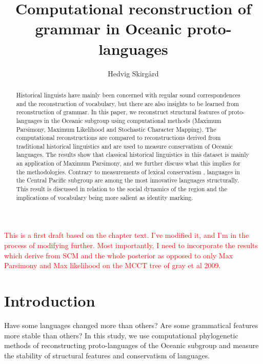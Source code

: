 \documentclass[draft,10pt]{article} %
\title{Computational reconstruction of grammar in Oceanic proto-languages}
\author{Hedvig Skirg{\aa}rd}
\begin{document}
\def\code#1{\texttt{#1}}

\thispagestyle{empty}

\maketitle
\thispagestyle{empty}

\tableofcontents
\newpage


\textcolor{red}{This is a first draft based on the chapter text. I've modified it, and I'm in the process of modifying further. Most importantly, I need to incorporate the results which derive from SCM and the whole posterior as opposed to only Max Parsimony and Max likelihood on the MCCT tree of gray et al 2009.}



\begin{abstract}


Historical linguists have mainly been concerned with regular sound correspondences and the reconstruction of vocabulary, but there are also insights to be learned from reconstruction of grammar. In this paper, we reconstruct structural features of proto-languages in the Oceanic subgroup using computational methods (Maximum Parsimony, Maximum Likelihood and Stochastic Character Mapping). The computational reconstructions are compared to reconstructions derived from traditional historical linguistics and are used to measure conservatism of Oceanic languages. The results show that classical historical linguistics in this dataset is mainly an application of Maximum Parsimony, and we further discuss what this implies for the methodologies. Contrary to measurements of lexical conservatism \citep{blust1981}, languages in the Central Pacific subgroup are among the most innovative languages structurally. This result is discussed in relation to the social dynamics of the region and the implications of vocabulary being more salient as identity marking.
\end{abstract}
\newpage

\doublespacing
\section{Introduction}
\label{acr:intro}
Have some languages changed more than others? Are some grammatical features more stable than others? In this study, we use computational phylogenetic methods of reconstructing proto-languages of the Oceanic subgroup and measure the stability of structural features and conservatism of languages.
\end{document}
